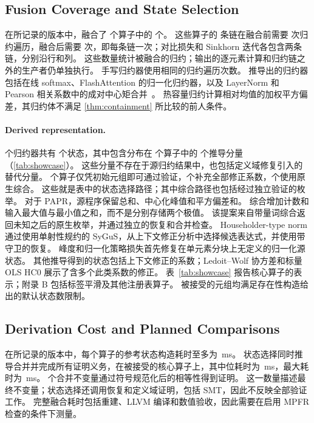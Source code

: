 \subsection{Fusion Coverage and State Selection}
\label{sec:eval-coverage}

在所记录的版本中，\sys 融合了 \nShowcase 个算子中的 \nShowFused 个。
这些算子的 \showChains 条链在融合前需要 \showPassesBefore 次归约遍历，融合后需要 \showPassesAfter 次，即每条链一次；对比损失和 Sinkhorn 迭代各包含两条链，分别沿行和列。
这些数量统计被融合的归约；输出的逐元素计算和归约链之外的生产者仍单独执行。
手写归约器使用相同的归约遍历次数。
推导出的归约器包括在线 softmax、FlashAttention 的归一化归约器，以及 LayerNorm 和 Pearson 相关系数中的成对中心矩合并~\citep{chan}。
热容量归约计算相对均值的加权平方偏差，其归约体不满足 \cref{thm:containment} 所比较的前人条件。


\paragraph{Derived representation.}
\label{sec:eval-states}

\showChains 个归约器共有 \showStates 个状态，其中包含分布在 \showDerivedOps 个算子中的 \showDerived 个推导分量（\cref{tab:showcase}）。
这些分量不存在于源归约结果中，也包括定义域修复引入的替代分量。
\showOriginalOps 个算子仅凭初始元组即可通过验证，\showRebaseOps 个补充全部修正系数，\showSygusOps 个使用原生综合。
这些就是表中的状态选择路径；其中综合路径也包括经过独立验证的枚举。
对于 PAPR，源程序保留总和、中心化峰值和平方偏差和。
综合增加计数和输入最大值与最小值之和，而不是分别存储两个极值。
该提案来自带量词综合返回未知之后的原生枚举，并通过独立的恢复和合并检查。
Householder-type norm 通过使用单射性规约的 SyGuS，从上下文修正分析中选择候选表达式，并使用带守卫的恢复。
峰度和归一化策略损失首先修复在单元素分块上无定义的归一化源状态。
其他推导得到的状态包括上下文修正的系数；Ledoit--Wolf 协方差和标量 OLS HC0 展示了含多个此类系数的修正。
表~\ref{tab:showcase} 报告核心算子的表示；附录 B 包括标签平滑及其他注册表算子。
被接受的元组均满足存在性构造给出的默认状态数限制。

\subsection{Derivation Cost and Planned Comparisons}
\label{sec:eval-cost}

在所记录的版本中，每个算子的参考状态构造耗时至多为 \showJudgeMaxMs{}\,ms。
状态选择同时推导合并并完成所有证明义务，在被接受的核心算子上，其中位耗时为 \showSelectMedianMs{}\,ms，最大耗时为 \showSelectMaxMs{}\,ms。
\showInvCanonical 个合并不变量通过符号规范化后的相等性得到证明。
这一数量描述最终不变量；状态选择还调用恢复和定义域证明，包括 SMT，因此不反映全部验证工作。
完整融合耗时包括重建、LLVM 编译和数值验收，因此需要在启用 MPFR 检查的条件下测量。

